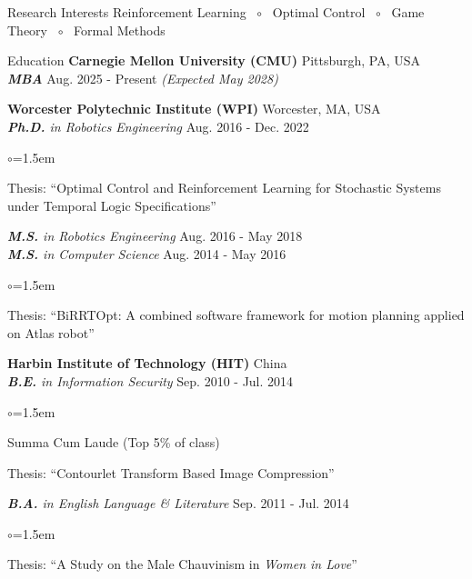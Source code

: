 \documentclass{resume} %
\begin{document}


\begin{rSection}{Research Interests}
Reinforcement Learning \, $\circ$ \,
Optimal Control \, $\circ$ \,
Game Theory \, $\circ$ \,
Formal Methods
\end{rSection}

\begin{rSection}{Education}
{\bf Carnegie Mellon University (CMU)} \hfill {Pittsburgh, PA, USA} \\
{\em{\bf MBA}} \hfill Aug. 2025 - Present {\em (Expected May 2028)}

{\bf Worcester Polytechnic Institute (WPI)} \hfill {Worcester, MA, USA} \\
{\em{\bf Ph.D.} in Robotics Engineering} \hfill Aug. 2016 - Dec. 2022
\begin{list}{$\circ$}{\leftmargin=1.5em}
\item Thesis: ``Optimal Control and Reinforcement Learning for Stochastic Systems under Temporal Logic Specifications''
\end{list}

{\em{\bf M.S.} in Robotics Engineering} \hfill Aug. 2016 - May 2018 \\
{\em{\bf M.S.} in Computer Science} \hfill Aug. 2014 - May 2016
\begin{list}{$\circ$}{\leftmargin=1.5em}
\item Thesis: ``BiRRTOpt: A combined software framework for motion planning applied on Atlas robot''
\end{list}

{\bf Harbin Institute of Technology (HIT)} \hfill {China} \\
{\em{\bf B.E.} in Information Security} \hfill Sep. 2010 - Jul. 2014
\begin{list}{$\circ$}{\leftmargin=1.5em}
\item Summa Cum Laude (Top 5\% of class) \vspace{-0.5em}
\item Thesis: ``Contourlet Transform Based Image Compression''
\end{list}

{\em{\bf B.A.} in English Language \& Literature} \hfill Sep. 2011 - Jul. 2014
\begin{list}{$\circ$}{\leftmargin=1.5em}
\item Thesis: ``A Study on the Male Chauvinism in \emph{Women in Love}''
\end{list}
\end{rSection}
\end{document}
